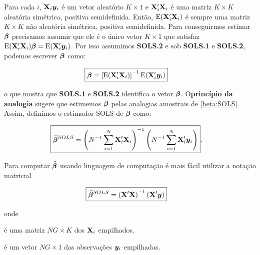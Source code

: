 \documentclass[11pt, oneside, a4paper, article]{article}
\numberwithin{equation}{section}
\begin{document}
Para cada $i$, $\mathbf{X}_{i} \boldsymbol{y}_{i}$ é um vetor aleatório $K \times 1$ e $\mathbf{X}_{i}'\mathbf{X}_{i}$ é uma matriz $K \times K$ aleatória simétrica, positiva semidefinida.
Então, $\text{E}(\mathbf{X}_{i}' \mathbf{X}_{i})$ é sempre uma matriz $K \times K$ não aleatória simétrica, positiva semidefinida.
Para conseguirmos estimar $\boldsymbol{\beta}$ precisamos assumir que ele é o único vetor $K \times 1$ que satisfaz $\text{E}( \mathbf{X}_{i}' \mathbf{X}_{i} ) \boldsymbol{\beta} = \text{E}( \mathbf{X}_{i}' \boldsymbol{y}_{i} )$.
Por isso assumimos \textbf{SOLS.2} e sob \textbf{SOLS.1} e \textbf{SOLS.2}, podemos escrever $\boldsymbol{\beta}$ como:

\vspace{-1 em}
\begin{align} \label{beta:SOLS}
	\Aboxed{
\betavec &=
\left[ \E( \Xmat_{i}' \Xmat_{i} )  \right]^{-1}
\E( \Xmat_{i}' \mbs{y}_{i} )  }
\end{align}

\noindent
o que mostra que \textbf{SOLS.1} e \textbf{SOLS.2} identifica o vetor $\boldsymbol{\beta}$.
O\textbf{princípio da analogia} sugere que estimemos $\boldsymbol{\beta}$ pelas analogias amostrais de \eqref{beta:SOLS}.
Assim, definimos o estimador SOLS de $\boldsymbol{\beta}$ como:

\vspace{-1 em}
\begin{align} \label{betahat:SOLS}
\Aboxed{
\betahatbold^{SOLS} &=
\left( N^{-1} \sum_{i=1}^{N} \Xmat_{i}' \Xmat_{i}   \right)^{-1}
\left( N^{-1} \sum_{i=1}^{N} \Xmat_{i}' \mbs{y}_{i}   \right)
}.
\end{align}

Para computar $\widehat{\boldsymbol{\beta}}$ usando linguagem de computação é mais fácil utilizar a notação matricial

\vspace{-1 em}
\begin{align} \label{betahat:SOLS:mat}
\Aboxed{
\betahatbold^{SOLS} &=
\left(  \Xmat' \Xmat   \right)^{-1} \left(  \Xmat' \mbs{y}   \right)
}
\end{align}

\noindent
onde

\vspace{-1 em}
\begin{description}[itemsep = -1ex]
\item [$\Xmat \equiv (\Xmat_{1}', \dots, \Xmat_{N}')$]  é uma matriz $NG \times K$ dos $\mathbf{X}_{i}$ empilhados.

\item [$\mbs{y} \equiv (\mbs{y}_{1}', \dots, \mbs{y}_{N}')$] é um vetor $NG \times 1$ das observações $\boldsymbol{y}_{i}$ empilhadas.
\end{description}
\end{document}
